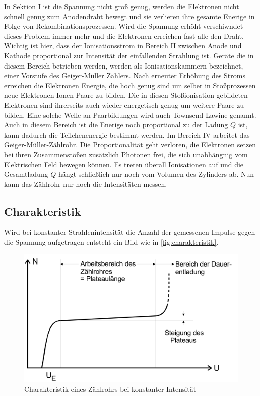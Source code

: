 In Sektion I ist die Spannung nicht groß genug, werden die Elektronen nicht schnell genug zum Anodendraht bewegt und sie verlieren ihre gesamte Enerige in Folge von Rekombinationsprozessen.
Wird die Spannung erhöht verschiwndet dieses Problem immer mehr und die Elektronen erreichen fast alle den Draht.
Wichtig ist hier, dass der Ionisationsstrom in Bereich II zwischen Anode und Kathode proportional zur Intensität der einfallenden Strahlung ist.
Geräte die in diesem Bereich betrieben werden, werden als Ionisationskammern bezeichnet, einer Vorstufe des Geiger-Müller Zählers.
Nach erneuter Erhöhung des Stroms erreichen die Elektronen Energie, die hoch genug sind um selber in Stoßprozessen neue Elektronen-Ionen Paare zu bilden. 
Die in diesen Stoßionisation gebildeten Elektronen sind ihrerseits auch wieder energetisch genug um weitere Paare zu bilden.
Eine solche Welle an Paarbildungen wird auch Townsend-Lawine genannt.
Auch in diesem Bereich ist die Enerige noch proportional zu der Ladung $Q$ ist, kann dadurch die Teilchenenergie bestimmt werden.
Im Bereich IV arbeitet das Geiger-Müller-Zählrohr.
Die Proportionalität geht verloren, die Elektronen setzen bei ihren Zusammenstößen zusätzlich Photonen frei, die sich unabhängnig vom Elektrischen Feld bewegen können. 
Es treten überall Ionisationen auf und die Gesamtladung $Q$ hängt schließlich nur noch vom Volumen des Zylinders ab. Nun kann das Zählrohr nur noch die Intensitäten messen.

\subsection{Charakteristik}
\label{ssec:t2}

Wird bei konstanter Strahlenintensität die Anzahl der gemessenen Impulse gegen die Spannung aufgetragen entsteht ein Bild wie in \autoref{fig:charakteristik}.

\begin{figure}
    \centering
    \includegraphics[width=\textwidth]{images/bild4.png}
    \caption{Charakteristik eines Zählrohrs bei konstanter Intensität}
    \label{fig:charakteristik}
\end{figure}

